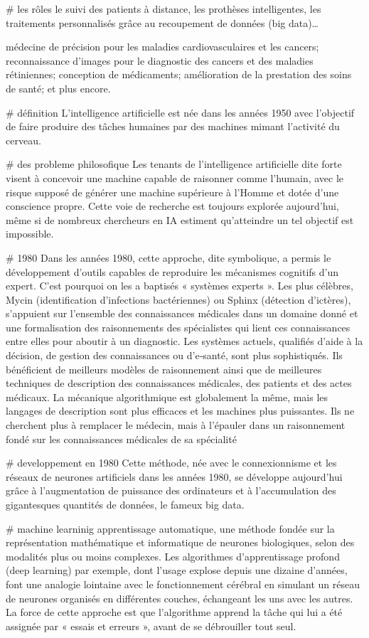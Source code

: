 # les rôles
le suivi des patients à distance,
les prothèses intelligentes,
les traitements personnalisés grâce au recoupement de données (big data)… 

médecine de précision pour les maladies cardiovasculaires et les cancers;
reconnaissance d’images pour le diagnostic des cancers et des maladies rétiniennes;
conception de médicaments;
amélioration de la prestation des soins de santé;
et plus encore.


# définition 
L’intelligence artificielle est née dans les années 1950 avec l’objectif de
faire produire des tâches humaines par des machines mimant l’activité du
cerveau.

# des probleme philosofique
Les tenants de l’intelligence artificielle dite forte visent à concevoir une
machine capable de raisonner comme l’humain, avec le risque supposé de générer
une machine supérieure à l’Homme et dotée d’une conscience propre. Cette voie
de recherche est toujours explorée aujourd’hui, même si de nombreux chercheurs
en IA estiment qu’atteindre un tel objectif est impossible. 

# 1980
Dans les années 1980, cette approche, dite symbolique, a permis le
développement d’outils capables de reproduire les mécanismes cognitifs d’un
expert. C’est pourquoi on les a baptisés « systèmes experts ». Les plus
célèbres, Mycin (identification d’infections bactériennes) ou Sphinx (détection
d’ictères), s’appuient sur l’ensemble des connaissances médicales dans un
domaine donné et une formalisation des raisonnements des spécialistes qui lient
ces connaissances entre elles pour aboutir à un diagnostic. Les systèmes
actuels, qualifiés d’aide à la décision, de gestion des connaissances ou
d’e‑santé, sont plus sophistiqués. Ils bénéficient de meilleurs modèles de
raisonnement ainsi que de meilleures techniques de description des
connaissances médicales, des patients et des actes médicaux. La mécanique
algorithmique est globalement la même, mais les langages de description sont
plus efficaces et les machines plus puissantes. Ils ne cherchent plus à
remplacer le médecin, mais à l’épauler dans un raisonnement fondé sur les
connaissances médicales de sa spécialité

# developpement en 1980
Cette méthode, née avec le connexionnisme et les réseaux de neurones
artificiels dans les années 1980, se développe aujourd’hui grâce à
l’augmentation de puissance des ordinateurs et à l’accumulation des
gigantesques quantités de données, le fameux big data.

# machine learninig
apprentissage automatique, une méthode fondée sur la représentation
mathématique et informatique de neurones biologiques, selon des modalités plus
ou moins complexes. Les algorithmes d’apprentissage profond (deep learning) par
exemple, dont l’usage explose depuis une dizaine d’années, font une analogie
lointaine avec le fonctionnement cérébral en simulant un réseau de neurones
organisés en différentes couches, échangeant les uns avec les autres. La force
de cette approche est que l’algorithme apprend la tâche qui lui a été assignée
par « essais et erreurs », avant de se débrouiller tout seul. 

